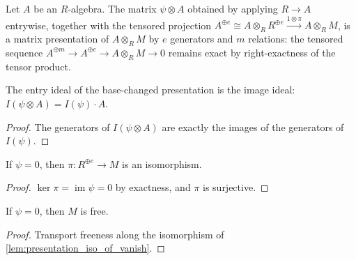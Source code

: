 \begin{definition}
  \label{def:matrix_presentation_base_change}
  \leanok
  Let \(A\) be an \(R\)-algebra.  The matrix \(\psi \otimes A\) obtained by
  applying \(R \to A\) entrywise, together with the tensored projection
  \(A^{\oplus e} \cong A \otimes_R R^{\oplus e}
    \xrightarrow{1 \otimes \pi} A \otimes_R M\),
  is a matrix presentation of \(A \otimes_R M\) by \(e\) generators and
  \(m\) relations: the tensored sequence
  \(A^{\oplus m} \to A^{\oplus e} \to A \otimes_R M \to 0\) remains exact by
  right-exactness of the tensor product.
\end{definition}

\begin{lemma}
  \label{lem:entry_ideal_base_change}
  \leanok
  The entry ideal of the base-changed presentation is the image ideal:
  \(I(\psi \otimes A) = I(\psi) \cdot A\).
\end{lemma}

\begin{proof}
  \leanok
  The generators of \(I(\psi \otimes A)\) are exactly the images of the
  generators of \(I(\psi)\).
\end{proof}

\begin{lemma}
  \label{lem:presentation_iso_of_vanish}
  \leanok
  If \(\psi = 0\), then \(\pi : R^{\oplus e} \to M\) is an isomorphism.
\end{lemma}

\begin{proof}
  \leanok
  \(\ker \pi = \operatorname{im} \psi = 0\) by exactness, and \(\pi\) is
  surjective.
\end{proof}

\begin{lemma}
  \label{lem:presentation_free_of_vanish}
  \leanok
  If \(\psi = 0\), then \(M\) is free.
\end{lemma}

\begin{proof}
  \leanok
  Transport freeness along the isomorphism of
  \cref{lem:presentation_iso_of_vanish}.
\end{proof}

